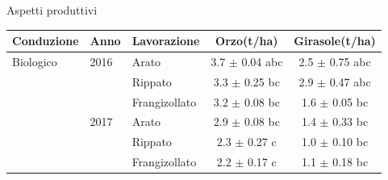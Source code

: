 \documentclass[10pt]{beamer}
\begin{document}
\begin{frame}{Aspetti produttivi}
  
  \vspace{0.5cm}
  \footnotesize{
    \begin{table}[ht]
      \centering
      \begin{tabular}{lllcc}
        \hline
        Conduzione   & Anno & Lavorazione   & Orzo(t/ha)         & Girasole(t/ha) \\ 
        \hline
        Biologico    & 2016 & Arato         & 3.7 $\pm$ 0.04 abc & 2.5 $\pm$ 0.75 abc\\ 
                     &      & Rippato       & 3.3 $\pm$ 0.25 bc  & 2.9 $\pm$ 0.47 abc\\ 
                     &      & Frangizollato & 3.2 $\pm$ 0.08 bc  & 1.6 $\pm$ 0.05 bc \\ 
                     & 2017 & Arato         & 2.9 $\pm$ 0.08 bc  & 1.4 $\pm$ 0.33 bc \\ 
                     &      & Rippato       & 2.3 $\pm$ 0.27 c   & 1.0 $\pm$ 0.10 bc \\ 
                     &      & Frangizollato & 2.2 $\pm$ 0.17 c   & 1.1 $\pm$ 0.18 bc \\ 

\end{tabular}
\end{table}}
\end{frame}
\end{document}
